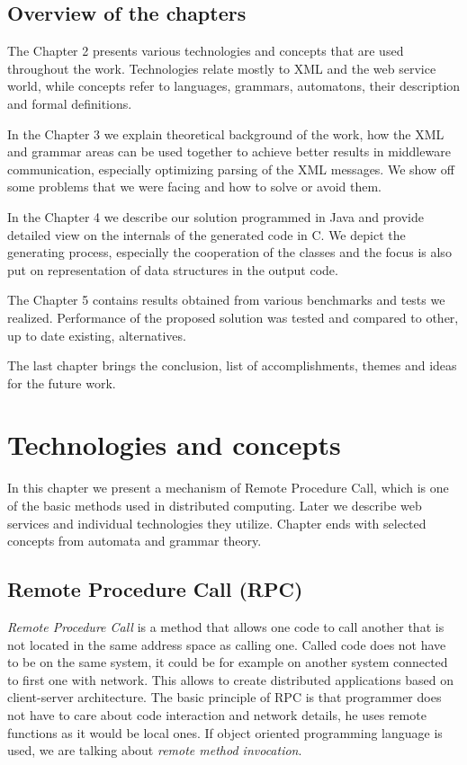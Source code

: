 \documentclass[12pt,notitlepage]{report}
\begin{document}
\section{Overview of the chapters}

The Chapter 2 presents various technologies and concepts that are used throughout the work. Technologies relate mostly to XML and the web service world, while concepts refer to languages, grammars, automatons, their description and formal definitions.

In the Chapter 3 we explain theoretical background of the work, how the XML and grammar areas can be used together to achieve better results in middleware communication, especially optimizing parsing of the XML messages. We show off some problems that we were facing and how to solve or avoid them.

In the Chapter 4 we describe our solution programmed in Java and provide detailed view on the internals of the generated code in C. We depict the generating process, especially the cooperation of the classes and the focus is also put on representation of data structures in the output code.

The Chapter 5 contains results obtained from various benchmarks and tests we realized. Performance of the proposed solution was tested and compared to other, up to date existing, alternatives.

The last chapter brings the conclusion, list of accomplishments, themes and ideas for the future work.

\chapter{Technologies and concepts}

In this chapter we present a mechanism of Remote Procedure Call, which is one of the basic methods used in distributed computing. Later we describe web services and individual technologies they utilize. Chapter ends with selected concepts from automata and grammar theory\cite{foja}.

\section{Remote Procedure Call (RPC)}

\textit{Remote Procedure Call} is a method that allows one code to call another that is not located
in the same address space as calling one. Called code does not have to be on the same system, it could be for example on another system connected to first one with network. This allows to create distributed applications based on client-server architecture. The basic principle of RPC is that programmer does not have to care about code interaction and network details, he uses remote functions as it would be local ones. If object oriented programming language is used, we are talking about \textit{remote method invocation}.
\end{document}
